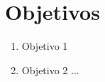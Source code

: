 \chapter{Objetivos}
\begin{enumerate}
    \item Objetivo 1
    \item Objetivo 2
    ...
\end{enumerate}
